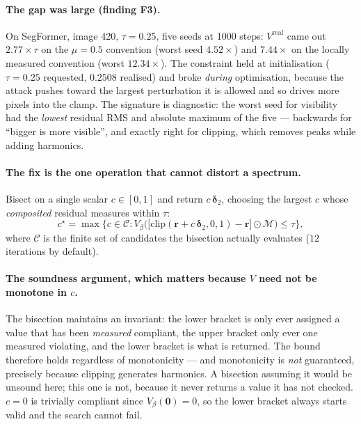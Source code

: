 \documentclass[11pt,a4paper]{article}
\begin{document}
\paragraph{The gap was large (finding F3).}
On SegFormer, image 420, $\tau=0.25$, five seeds at 1000 steps:
$V^{\mathrm{real}}$ came out $2.77\times\tau$ on the $\mu=0.5$ convention
(worst seed $4.52\times$) and $7.44\times$ on the locally measured
convention (worst $12.34\times$). The constraint held at initialisation
($\tau=0.25$ requested, $0.2508$ realised) and broke \emph{during}
optimisation, because the attack pushes toward the largest perturbation it
is allowed and so drives more pixels into the clamp. The signature is
diagnostic: the worst seed for visibility had the \emph{lowest} residual RMS
and absolute maximum of the five --- backwards for ``bigger is more
visible'', and exactly right for clipping, which removes peaks while adding
harmonics.

\paragraph{The fix is the one operation that cannot distort a spectrum.}
Bisect on a single scalar $c\in[0,1]$ and return $c\,\boldsymbol{\delta}_2$,
choosing the largest $c$ whose \emph{composited} residual measures within
$\tau$:
\begin{equation}
  c^\star = \max\Big\{c\in\mathcal{C} :
    V_\beta\Big(\big[\mathrm{clip}(\mathbf{r}+c\,\boldsymbol{\delta}_2,0,1)
    -\mathbf{r}\big]\odot\mathcal{M}\Big)\le\tau\Big\},
  \label{eq:bisect}
\end{equation}
where $\mathcal{C}$ is the finite set of candidates the bisection actually
evaluates ($12$ iterations by default).

\paragraph{The soundness argument, which matters because $V$ need not be
monotone in $c$.} The bisection maintains an invariant: the lower bracket is
only ever assigned a value that has been \emph{measured} compliant, the
upper bracket only ever one measured violating, and the lower bracket is
what is returned. The bound therefore holds regardless of monotonicity ---
and monotonicity is \emph{not} guaranteed, precisely because clipping
generates harmonics. A bisection assuming it would be unsound here; this one
is not, because it never returns a value it has not checked. $c=0$ is
trivially compliant since $V_\beta(\mathbf{0})=0$, so the lower bracket
always starts valid and the search cannot fail.
\end{document}
